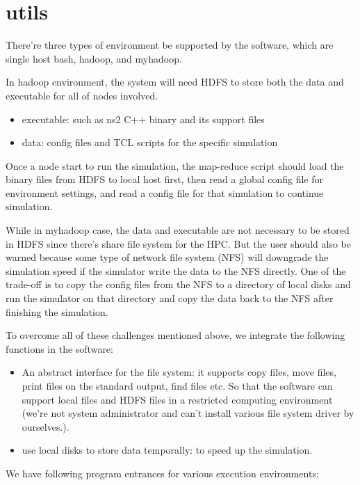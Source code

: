 \section{utils}

There're three types of environment be supported by the software,
which are single host bash, hadoop, and myhadoop.

In hadoop environment, the system will need HDFS to store both the data and executable for all of nodes involved.
\begin{itemize}
  \item executable: such as ns2 C++ binary and its support files
  \item data: config files and TCL scripts for the specific simulation
\end{itemize}
Once a node start to run the simulation, the map-reduce script should load the binary files from HDFS to local host first,
then read a global config file for environment settings,
and read a config file for that simulation to continue simulation.

While in myhadoop case, the data and executable are not necessary to be stored in HDFS since there's share file system for the HPC.
But the user should also be warned because some type of network file system (NFS) will downgrade the simulation speed if the simulator write the data to the NFS directly.
One of the trade-off is to copy the config files from the NFS to a directory of local disks and run the simulator on that directory and copy the data back to the NFS after finishing the simulation.

To overcome all of these challenges mentioned above,
we integrate the following functions in the software:
\begin{itemize}
  \item An abstract interface for the file system: it supports copy files, move files, print files on the standard output, find files etc. So that the software can support local files and HDFS files in a restricted computing environment (we're not system administrator and can't install various file system driver by ourselves.).
  \item use local disks to store data temporally: to speed up the simulation.
\end{itemize}


We have following program entrances for various execution environments:

